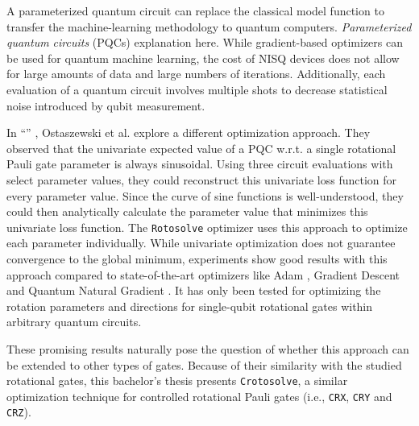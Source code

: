 A parameterized quantum circuit can replace the classical model function to
transfer the machine-learning methodology to quantum computers.
\emph{Parameterized quantum circuits} (PQCs) explanation here. %
While gradient-based optimizers can be used for quantum machine learning,
the cost of NISQ devices does not allow for large amounts of data and large
numbers of iterations.
Additionally, each evaluation of a quantum circuit involves multiple shots to
decrease statistical noise introduced by qubit measurement.

In ``\emph{}''
\cite{ostaszewski_structure_2021}, Ostaszewski et al. explore a different
optimization approach.
They observed that the univariate expected value of a PQC w.r.t. a single
rotational Pauli gate parameter is always sinusoidal.
Using three circuit evaluations with select parameter values, they could
reconstruct this univariate loss function for every parameter value.
Since the curve of sine functions is well-understood, they could then
analytically calculate the parameter value that minimizes this univariate loss
function.
The \texttt{Rotosolve} optimizer uses this approach to optimize each parameter
individually.
While univariate optimization does not guarantee convergence to the global
minimum, experiments show good results with this approach compared to
state-of-the-art optimizers like Adam \cite{kingma_adam_2017},
Gradient Descent and Quantum Natural Gradient \cite{stokes_quantum_2020}.
It has only been tested for optimizing the rotation parameters and directions
for single-qubit rotational gates within arbitrary quantum circuits.

These promising results naturally pose the question of whether this approach can
be extended to other types of gates.
Because of their similarity with the studied rotational gates, this bachelor's
thesis presents \texttt{Crotosolve}, a similar optimization technique for
controlled rotational Pauli gates (i.e., \texttt{CRX}, \texttt{CRY} and
\texttt{CRZ}).



